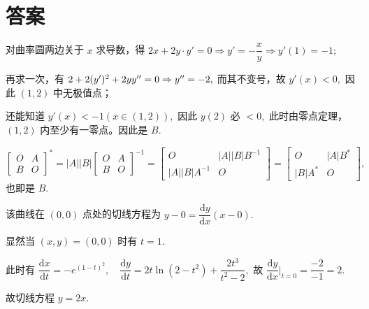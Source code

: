 \chapter{答案}

\begin{answer}[2009T5]{}

    对曲率圆两边关于 $ x $ 求导数，得 $ 2x + 2y\cdot y'=0 \Rightarrow y' = -\dfrac{x}{y} \Rightarrow y'(1) = -1; $ 
    
    再求一次，有 $ 2 + 2 (y')^2 + 2yy^{\prime\prime} = 0 \Rightarrow y^{\prime\prime} = -2, $ 而其不变号，故 $ y'(x) < 0, $ 
    因此 $ (1,2) $ 中无极值点；
    
    还能知道 $ y'(x) < -1 (x\in(1,2)), $ 因此 $ y(2) $ 必 $ < 0, $ 
    此时由零点定理，$ (1,2) $ 内至少有一零点。因此是 $ B. $ 
\end{answer}

\begin{answer}[2009T7]{}

    $ \begin{bmatrix}
        O&A\\B&O
    \end{bmatrix}^* = 
    |A||B|\begin{bmatrix}
        O&A\\B&O
    \end{bmatrix}^{-1} = \begin{bmatrix}
        O&|A||B|B^{-1}\\|A||B|A^{-1}&O
    \end{bmatrix} = \begin{bmatrix}
        O&|A|B^{*}\\|B|A^{*}&O
    \end{bmatrix}, $ 也即是 $ B. $ 
\end{answer}

\begin{answer}[2009T9]{}

    该曲线在 $ (0,0) $ 点处的切线方程为 $ y - 0 = \dfrac{\mathrm{d}y}{\mathrm{d}x}(x - 0). $ 

    显然当 $ (x,y) = (0,0) $ 时有 $ t = 1. $ 

    此时有 $ \dfrac{\mathrm{d}x}{\mathrm{d}t} = -e^{(1-t)^2},\quad{}
            \dfrac{\mathrm{d}y}{\mathrm{d}t} = 2t\ln(2-t^2) + \dfrac{2t^3}{t^2 - 2}, $ 
    故 $ \dfrac{\mathrm{d}y}{\mathrm{d}x}\Big|_{t = 0}
    = \dfrac{-2}{-1} = 2. $ 

    故切线方程 $  y = 2x. $ 
\end{answer}

